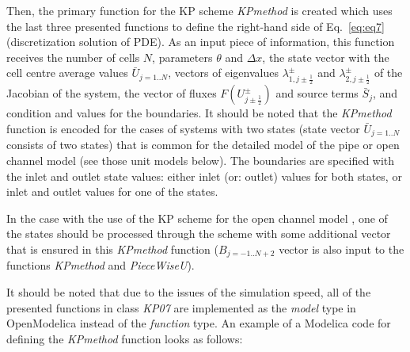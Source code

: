 \documentclass[%
]{USN-PhD}
\begin{document}
Then, the primary function for the KP scheme \emph{KPmethod} is created which uses the last three presented functions to define the right-hand side of Eq.~\ref{eq:eq7} (discretization solution of PDE).  As an input piece of information, this function receives the number of cells $N$, parameters $\theta$ and $\Delta x$, the state vector with the cell centre average values $\bar{U}_{j=1..N}$, vectors of eigenvalues $\lambda^\pm_{1,j\pm\frac{1}{2}}$ and $\lambda^\pm_{2,j\pm\frac{1}{2}}$ of the Jacobian of the system, the vector of fluxes $F\left(U^\pm_{j\pm\frac{1}{2}}\right)$ and source terms $\bar{S}_j$, and condition and values for the boundaries. It should be noted that the \emph{KPmethod} function is encoded for the cases of systems with two states (state vector $\bar{U}_{j=1..N}$ consists of two states) that is common for the detailed model of the pipe or open channel model (see those unit models below). The boundaries are specified with the inlet and outlet state values: either inlet (or: outlet) values for both states, or inlet and outlet values for one of the states.

In the case with the use of the KP scheme for the open channel model \cite{Sha:15,Vyt:15}, one of the states should be processed through the scheme with some additional vector that is ensured in this \emph{KPmethod} function ($B_{j=-1..N+2}$ vector is also input to the functions \emph{KPmethod} and \emph{PieceWiseU}).

It should be noted that due to the issues of the simulation speed, all of the presented functions in class \emph{KP07} are implemented as the \emph{model} type in OpenModelica instead of the \emph{function} type. An example of a Modelica code for defining the \emph{KPmethod} function looks as follows:
\end{document}
